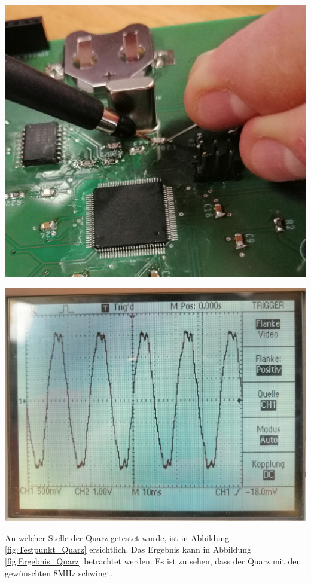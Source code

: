 {\begin{minipage}[b][7cm][t]{0.49\textwidth}
\centering
\includegraphics[width=0.9\linewidth]{graphics/HW_Val/Testpunkt_Quarz.jpg}
\label{fig:Testpunkt_Quarz}
\end{minipage}}
{\begin{minipage}[b][7cm][t]{0.49\textwidth}
\centering
\includegraphics[width=0.9\linewidth]{graphics/HW_Val/Ergebnis_Quarz.jpg}
\label{fig:Ergebnis_Quarz}
\end{minipage}}

An welcher Stelle der Quarz getestet wurde, ist in Abbildung \ref{fig:Testpunkt_Quarz} ersichtlich. Das Ergebnis kann in Abbildung \ref{fig:Ergebnis_Quarz} betrachtet werden. Es ist zu sehen, dass der Quarz mit den gewünschten 8MHz schwingt.


